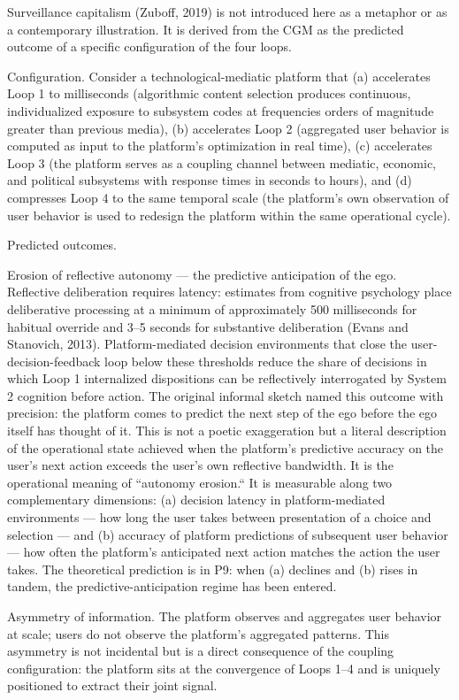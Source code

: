 \documentclass[12pt,a4paper]{article}
\begin{document}
Surveillance capitalism (Zuboff, 2019) is not introduced here as a metaphor or as a contemporary illustration. It is derived from the CGM as the predicted outcome of a specific configuration of the four loops.


Configuration. Consider a technological-mediatic platform that (a) accelerates Loop 1 to milliseconds (algorithmic content selection produces continuous, individualized exposure to subsystem codes at frequencies orders of magnitude greater than previous media), (b) accelerates Loop 2 (aggregated user behavior is computed as input to the platform's optimization in real time), (c) accelerates Loop 3 (the platform serves as a coupling channel between mediatic, economic, and political subsystems with response times in seconds to hours), and (d) compresses Loop 4 to the same temporal scale (the platform's own observation of user behavior is used to redesign the platform within the same operational cycle).


Predicted outcomes.


Erosion of reflective autonomy --- the predictive anticipation of the ego. Reflective deliberation requires latency: estimates from cognitive psychology place deliberative processing at a minimum of approximately 500 milliseconds for habitual override and 3--5 seconds for substantive deliberation (Evans and Stanovich, 2013). Platform-mediated decision environments that close the user-decision-feedback loop below these thresholds reduce the share of decisions in which Loop 1 internalized dispositions can be reflectively interrogated by System 2 cognition before action. The original informal sketch named this outcome with precision: the platform comes to predict the next step of the ego before the ego itself has thought of it. This is not a poetic exaggeration but a literal description of the operational state achieved when the platform's predictive accuracy on the user's next action exceeds the user's own reflective bandwidth. It is the operational meaning of ``autonomy erosion.`` It is measurable along two complementary dimensions: (a) decision latency in platform-mediated environments --- how long the user takes between presentation of a choice and selection --- and (b) accuracy of platform predictions of subsequent user behavior --- how often the platform's anticipated next action matches the action the user takes. The theoretical prediction is in P9: when (a) declines and (b) rises in tandem, the predictive-anticipation regime has been entered.

Asymmetry of information. The platform observes and aggregates user behavior at scale; users do not observe the platform's aggregated patterns. This asymmetry is not incidental but is a direct consequence of the coupling configuration: the platform sits at the convergence of Loops 1--4 and is uniquely positioned to extract their joint signal.
\end{document}
